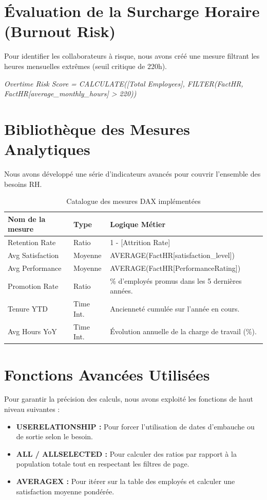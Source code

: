 \section{Évaluation de la Surcharge Horaire (Burnout Risk)}

Pour identifier les collaborateurs à risque, nous avons créé une mesure filtrant les heures mensuelles extrêmes (seuil critique de 220h).

\begin{center}
\textit{Overtime Risk Score = CALCULATE([Total Employees], FILTER(FactHR, FactHR[average\_monthly\_hours] > 220))}
\end{center}

\section{Bibliothèque des Mesures Analytiques}

Nous avons développé une série d'indicateurs avancés pour couvrir l'ensemble des besoins RH.

\begin{table}[h]
\centering
\begin{tabular}{|l|l|p{6cm}|}
\hline
\textbf{Nom de la mesure} & \textbf{Type} & \textbf{Logique Métier} \\ \hline
Retention Rate & Ratio & 1 - [Attrition Rate] \\ \hline
Avg Satisfaction & Moyenne & AVERAGE(FactHR[satisfaction\_level]) \\ \hline
Avg Performance & Moyenne & AVERAGE(FactHR[PerformanceRating]) \\ \hline
Promotion Rate & Ratio & \% d'employés promus dans les 5 dernières années. \\ \hline
Tenure YTD & Time Int. & Ancienneté cumulée sur l'année en cours. \\ \hline
Avg Hours YoY & Time Int. & Évolution annuelle de la charge de travail (\%). \\ \hline
\end{tabular}
\caption{Catalogue des mesures DAX implémentées}
\end{table}

\section{Fonctions Avancées Utilisées}

Pour garantir la précision des calculs, nous avons exploité les fonctions de haut niveau suivantes :
\begin{itemize}
    \item \textbf{USERELATIONSHIP :} Pour forcer l'utilisation de dates d'embauche ou de sortie selon le besoin.
    \item \textbf{ALL / ALLSELECTED :} Pour calculer des ratios par rapport à la population totale tout en respectant les filtres de page.
    \item \textbf{AVERAGEX :} Pour itérer sur la table des employés et calculer une satisfaction moyenne pondérée.
\end{itemize}

